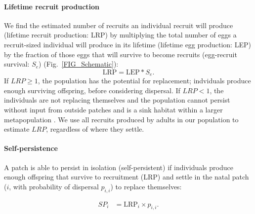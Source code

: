 \documentclass[12pt, oneside]{article}   	%
\begin{document}
\paragraph*{Lifetime recruit production}

We find the estimated number of recruits an individual recruit will produce (lifetime recruit production: LRP) by multiplying the total number of eggs a recruit-sized individual will produce in its lifetime (lifetime egg production: LEP) by the fraction of those eggs that will survive to become recruits (egg-recruit survival: $S_e$) (Fig.\ \ref{FIG_Schematic}):
\begin{equation}
\text{LRP} = \text{LEP} * S_e. \label{EQN_LRP}
\end{equation}
If $LRP \geq 1$, the population has the potential for replacement; indviduals produce enough surviving offspring, before considering dispersal. If $LRP < 1$, the individuals are not replacing themselves and the population cannot persist without input from outside patches and is a sink habitat within a larger metapopulation \citep{pulliam1988sources}. We use all recruits produced by adults in our population to estimate $LRP$, regardless of where they settle.

\paragraph*{Self-persistence} 

A patch is able to persist in isolation (self-persistent) if individuals produce enough offspring that survive to recruitment (LRP) and settle in the natal patch ($i$, with probability of dispersal $p_{i,i}$) to replace themselves:

\begin{equation}
\begin{split}
SP_i &= \text{LRP}_i \times p_{i,i}. \label{EQN_SP}  %
\end{split}
\end{equation}
\end{document}

